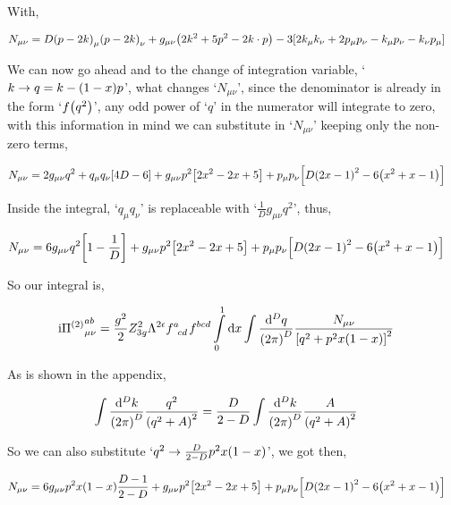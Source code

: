 With,

\begin{align}
    N_{\mu\nu}&=D\qty(p-2k)_\mu\qty(p-2k)_\nu+g_{\mu\nu}\qty(2k^2+5p^2-2k\cdot p)-3\qty[2k_\mu k_\nu+2 p_\mu p_\nu-k_\mu p_\nu-k_\nu p_\mu]\nonumber
\end{align}

We can now go ahead and to the change of integration variable, `$k\rightarrow q=k-\qty(1-x)p$', what changes `$N_{\mu\nu}$', 
since the denominator is already in the form `$f\qty(q^2)$', any odd power of `$q$' in the numerator will integrate to zero, 
with this information in mind we can substitute in `$N_{\mu\nu}$' keeping only the non-zero terms,

\begin{align}
    N_{\mu\nu}&=2g_{\mu\nu}q^2+q_\mu q_\nu\qty[4 D-6]+g_{\mu\nu}p^2\qty[2x^2-2x+5]+p_\mu p_\nu\qty[D\qty(2x-1)^2-6\qty(x^2+x-1)]\nonumber
\end{align}

Inside the integral, `$q_\mu q_\nu$' is replaceable with `$\frac1Dg_{\mu\nu}q^2$', thus,

\begin{align}
    N_{\mu\nu}&=6g_{\mu\nu}q^2\qty[1-\frac 1D]+g_{\mu\nu}p^2\qty[2x^2-2x+5]+p_\mu p_\nu\qty[D\qty(2x-1)^2-6\qty(x^2+x-1)]\nonumber
\end{align}

So our integral is,

\begin{align}
    \im {\Pi^{\qty(2)}}^{ab}_{\mu\nu}&=\frac{g^2}{2}Z_{3g}^2\Lambda^{2\epsilon}\tensor{f}{^a_c_d}\tensor{f}{^b^c^d}\int\limits_0^1\dd{x}\int\frac{\dd[D]{q}}{\qty(2\pi)^D}\frac{N_{\mu\nu}}{\qty[q^2+p^2x\qty(1-x)]^2}\nonumber
\end{align}

As is shown in the appendix,

\begin{align}
    \int\frac{\dd[D]{k}}{\qty(2\pi)^D}\frac{q^2}{\qty(q^2+A)^2}&=\frac{D}{2-D}\int\frac{\dd[D]{k}}{\qty(2\pi)^D}\frac{A}{\qty(q^2+A)^2}
\end{align}

So we can also substitute `$q^2\rightarrow\frac{D}{2-D}p^2x\qty(1-x)$', we got then,

\begin{align}
    N_{\mu\nu}&=6g_{\mu\nu}p^2x\qty(1-x)\frac{D-1}{2-D}+g_{\mu\nu}p^2\qty[2x^2-2x+5]+p_\mu p_\nu\qty[D\qty(2x-1)^2-6\qty(x^2+x-1)]\nonumber
\end{align}

